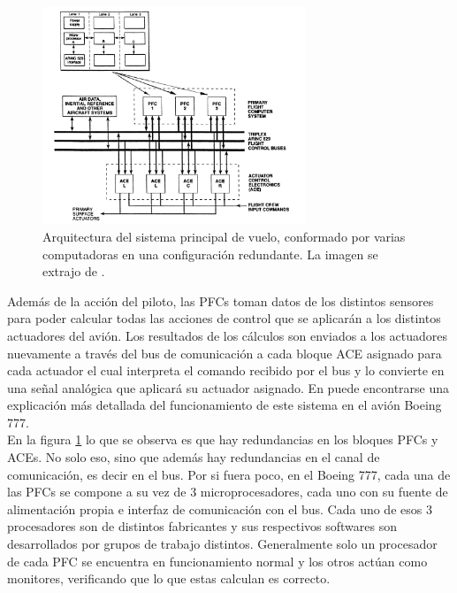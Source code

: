 \begin{figure}[H]
    \centering
    \includegraphics[width=0.7\textwidth]{img/Boeing_777_diagrama.png}
    \caption{Arquitectura del sistema principal de vuelo, conformado por varias computadoras en una configuración redundante. La imagen se extrajo de \cite{collinson2023introduction}.}
    \label{fig:Boeing_777_diagrama}
\end{figure}

Además de la acción del piloto, las PFCs toman datos de los distintos sensores para poder calcular todas las acciones de control que se aplicarán a los distintos actuadores del avión. Los resultados de los cálculos son enviados a los actuadores nuevamente a través del bus de comunicación a cada bloque ACE asignado para cada actuador el cual interpreta el comando recibido por el bus y lo convierte en una señal analógica que aplicará su actuador asignado. En \cite{yeh1996triple} puede encontrarse una explicación más detallada del funcionamiento de este sistema en el avión Boeing 777.\\

En la figura \ref{fig:Boeing_777_diagrama} lo que se observa es que hay redundancias en los bloques PFCs y ACEs. No solo eso, sino que además hay redundancias en el canal de comunicación, es decir en el bus. Por si fuera poco, en el Boeing 777, cada una de las PFCs se compone a su vez de 3 microprocesadores, cada uno con su fuente de alimentación propia e interfaz de comunicación con el bus. Cada uno de esos 3 procesadores son de distintos fabricantes y sus respectivos softwares son desarrollados por grupos de trabajo distintos. Generalmente solo un procesador de cada PFC se encuentra en funcionamiento normal y los otros actúan como monitores, verificando que lo que estas calculan es correcto.\\

